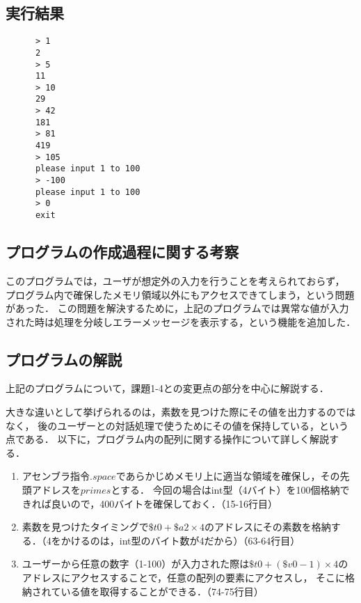 \documentclass[a4j,11pt]{jarticle}
\begin{document}
\subsection{実行結果}

\begin{verbatim}
      > 1
      2
      > 5
      11
      > 10
      29
      > 42
      181
      > 81
      419
      > 105
      please input 1 to 100
      > -100
      please input 1 to 100
      > 0
      exit            
\end{verbatim}

\subsection{プログラムの作成過程に関する考察}

このプログラムでは，ユーザが想定外の入力を行うことを考えられておらず，
プログラム内で確保したメモリ領域以外にもアクセスできてしまう，という問題があった．
この問題を解決するために，上記のプログラムでは異常な値が入力された時は処理を分岐しエラーメッセージを表示する，という機能を追加した．

\subsection{プログラムの解説}
上記のプログラムについて，課題1-4との変更点の部分を中心に解説する．

大きな違いとして挙げられるのは，素数を見つけた際にその値を出力するのではなく，
後のユーザーとの対話処理で使うためにその値を保持している，という点である．
以下に，プログラム内の配列に関する操作について詳しく解説する．

\begin{enumerate}
      \item アセンブラ指令$.space$であらかじめメモリ上に適当な領域を確保し，その先頭アドレスを$primes$とする．
      今回の場合はint型（4バイト）を100個格納できれば良いので，400バイトを確保しておく．（15-16行目）
      \item 素数を見つけたタイミングで$\$t0 + \$a2 \times 4$のアドレスにその素数を格納する．（4をかけるのは，int型のバイト数が4だから）（63-64行目）
      \item ユーザーから任意の数字（1-100）が入力された際は$\$t0 + (\$v0 - 1) \times 4$のアドレスにアクセスすることで，任意の配列の要素にアクセスし，
      そこに格納されている値を取得することができる．（74-75行目）
\end{enumerate}


\end{document}
